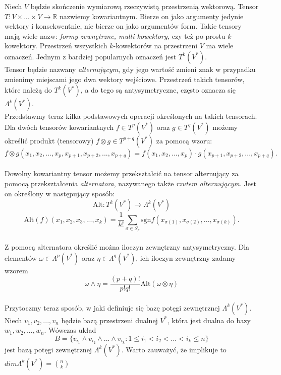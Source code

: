 \documentclass[licencjacka]{pracamgr}
\theoremstyle{definition}
\theoremstyle{definition}
\theoremstyle{plain}
\theoremstyle{plain}
\theoremstyle{plain}
\theoremstyle{plain}
\begin{document}
Niech $V$ będzie skończenie wymiarową rzeczywistą przestrzenią wektorową.
Tensor $T:V \times ... \times V \rightarrow \mathbb{R}$ nazwiemy kowariantnym.
Bierze on jako argumenty jedynie wektory i konsekwentnie, nie bierze on jako
argumentów form.  Takie tensory mają wiele nazw: \emph{formy zewnętrzne,
multi-kowektory,} czy też po prostu $k$-kowektory.  Przestrzeń wszystkich
$k$-kowektorów na przestrzeni $V$ ma wiele oznaczeń.  Jednym z bardziej
popularnych oznaczeń jest $T^k (V^\ast)$. \\

Tensor będzie nazwany \emph{alternującym}, gdy jego wartość zmieni znak w
przypadku zmienimy miejscami jego dwa wektory wejściowe.  Przestrzeń takich
tensorów, które należą do $T^k (V^\ast)$, a do tego są antysymetryczne, często
oznacza się $\Lambda^k (V^\ast)$. \\

Przedstawmy teraz kilka podstawowych operacji określonych na takich tensorach.
Dla dwóch tensorów kowariantnych $f \in T^p(V^\ast) $ oraz $g \in T^q(V^\ast) $
możemy określić produkt (tensorowy) $f \otimes g \in T^{p+q}(V^\ast) $ za
pomocą wzoru:
\[
  f \otimes g(x_1, x_2, ..., x_p, x_{p+1}, x_{p+2}, ... ,x_{p+q}) =
  f(x_1, x_2, ... , x_p) \cdot g(x_{p+1}, x_{p+2}, ... , x_{p+q}).
\] \\

Dowolny kowariantny tensor możemy
przekształcić na tensor alternujący za pomocą przekształcenia
\emph{alternatora}, nazywanego także \emph{rzutem alternującym}.
Jest on określony w następujący sposób:
\[
\text{Alt}:T^k (V^\ast) \rightarrow  \Lambda^k (V^\ast)
\]
\[
\text{Alt}(f)(x_1, x_2, x_3, ..., x_k) = \frac{1}{k!}
  \sum_{\sigma \in S_p}
     \text{sgn} f(x_{\sigma(1)}, x_{\sigma(2)}, ..., x_{\sigma(k)}).
\] \\

Z pomocą alternatora określić można iloczyn zewnętrzny antysymetryczny. 
Dla elementów $\omega \in \Lambda^p (V^\ast)$ oraz 
$\eta \in \Lambda^q (V^\ast)$, ich iloczyn zewnętrzny zadamy wzorem
\[
  \omega \wedge \eta = \frac{(p+q)!}{p!q!} \text{Alt} (\omega \otimes \eta)
\] \\

Przytoczmy teraz sposób, w jaki definiuje się bazę potęgi zewnętrznej
$\Lambda^k(V^\ast)$. Niech $v_1, v_2, ... , v_n$ będzie bazą przestrzeni dualnej
$V^\ast$, która jest dualna do bazy $w_1, w_2, ..., w_n$.
Wówczas układ
\[
  B = \{ v_{i_1} \wedge v_{i_2} \wedge ... \wedge v_{i_k} : 1 \leq i_1 < i_2 < ... <i_k \leq n \}
\]
jest bazą potęgi zewnętrznej $\Lambda^k(V^\ast)$. Warto zauważyć, że implikuje
 to $dim \Lambda^k ( V^\ast)= \binom{n}{k}$
\end{document}
